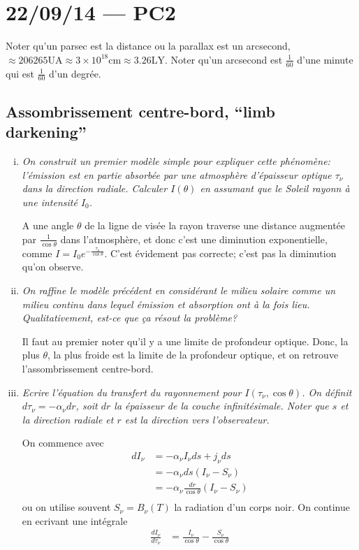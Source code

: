 \documentclass[10pt]{report}
\newcommand{\scinot}[2]{#1\times 10^{#2}}
\newcommand{\rd}[2]{\frac{d#1}{d#2}}
\begin{document}
\chapter{22/09/14 --- PC2}

Noter qu'un parsec est la distance ou la parallax est un arcsecond, $\approx 206265 \mathrm{UA} \approx \scinot{3}{18}\mathrm{cm} \approx 3.26\mathrm{LY}$. Noter qu'un arcsecond est $\frac{1}{60}$ d'une minute qui est $\frac{1}{60}$ d'un degr\'ee.

\section{Assombrissement centre-bord, ``limb darkening''}

\begin{enumerate}[i)]
    \item \emph{On construit un premier mod\`ele simple pour expliquer cette ph\'enom\`ene: l'\'emission est en partie absorb\'ee par une atmosph\`ere d'\'epaisseur optique $\tau_\nu$ dans la direction radiale. Calculer $I(\theta)$ en assumant que le Soleil rayonn \`a une intensit\'e $I_0$.}

        A une angle $\theta$ de la ligne de vis\'ee la rayon traverse une distance augment\'ee par $\frac{1}{\cos\theta}$ dans l'atmosph\`ere, et donc c'est une diminution exponentielle, comme $I = I_0 e^{-\frac{\tau_\nu}{\cos\theta}}$. C'est \'evidement pas correcte; c'est pas la diminution qu'on observe.

    \item \emph{On raffine le mod\`ele pr\'ec\'edent en consid\'erant le milieu solaire comme un milieu continu dans lequel \'emission et absorption ont \`a la fois lieu. Qualitativement, est-ce que \c{c}a r\'esout la probl\`eme?}

        Il faut au premier noter qu'il y a une limite de profondeur optique. Donc, la plus $\theta$, la plus froide est la limite de la profondeur optique, et on retrouve l'assombrissement centre-bord.

    \item \emph{Ecrire l'\'equation du transfert du rayonnement pour $I(\tau_\nu, \cos\theta)$. On d\'efinit $d\tau_\nu = -\alpha_\nu dr$, soit $dr$ la \'epaisseur de la couche infinit\'esimale. Noter que $s$ et la direction radiale et $r$ est la direction vers l'observateur.}

        On commence avec 
        \begin{align}
            dI_\nu &= -\alpha_\nu I_\nu ds + j_\nu ds\\
            &= -\alpha_\nu ds\left( I_\nu - S_\nu \right)\\
            &= -\alpha_\nu \frac{dr}{\cos\theta}\left( I_\nu - S_\nu \right)\\
        \end{align}
        ou on utilise souvent $S_\nu = B_\nu(T)$ la radiation d'un corps noir. On continue en ecrivant une int\'egrale
        \begin{align}
            \rd{I_\nu}{\tau_\nu} &= \frac{I_\nu}{\cos\theta} - \frac{S_\nu}{\cos\theta}
        \end{align}
        

\end{enumerate}
\end{document}
